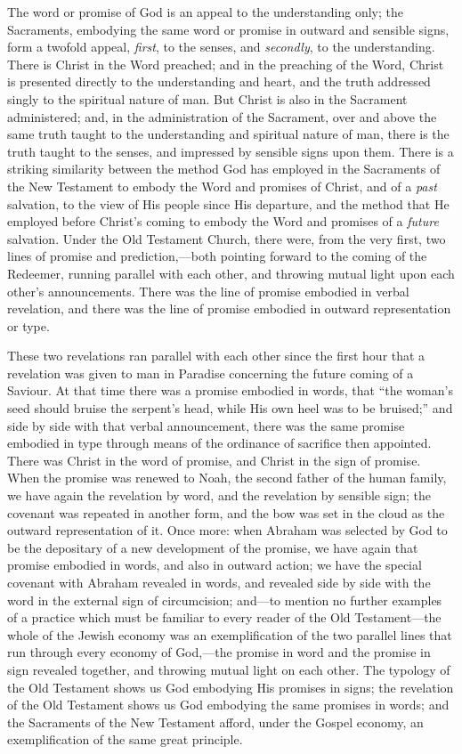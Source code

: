 \documentclass[
  english,
]{book}
\begin{document}
The word or promise of God is an appeal to the understanding only; the Sacraments, embodying the same word or promise in outward and sensible signs, form a twofold appeal, \emph{first}, to the senses, and \emph{secondly}, to the understanding. There is Christ in the Word preached; and in the preaching of the Word, Christ is presented directly to the understanding and heart, and the truth addressed singly to the spiritual nature of man. But Christ is also in the Sacrament administered; and, in the administration of the Sacrament, over and above the same truth taught to the understanding and spiritual nature of man, there is the truth taught to the senses, and impressed by sensible signs upon them. There is a striking similarity between the method God has employed in the Sacraments of the New Testament to embody the Word and promises of Christ, and of a \emph{past} salvation, to the view of His people since His departure, and the method that He employed before Christ's coming to embody the Word and promises of a \emph{future} salvation. Under the Old Testament Church, there were, from the very first, two lines of promise and prediction,---both pointing forward to the coming of the Redeemer, running parallel with each other, and throwing mutual light upon each other's announcements. There was the line of promise embodied in verbal revelation, and there was the line of promise embodied in outward representation or type.

These two revelations ran parallel with each other since the first hour that a revelation was given to man in Paradise concerning the future coming of a Saviour. At that time there was a promise embodied in words, that ``the woman's seed should bruise the serpent's head, while His own heel was to be bruised;'' and side by side with that verbal announcement, there was the same promise embodied in type through means of the ordinance of sacrifice then appointed. There was Christ in the word of promise, and Christ in the sign of promise. When the promise was renewed to Noah, the second father of the human family, we have again the revelation by word, and the revelation by sensible sign; the covenant was repeated in another form, and the bow was set in the cloud as the outward representation of it. Once more: when Abraham was selected by God to be the depositary of a new development of the promise, we have again that promise embodied in words, and also in outward action; we have the special covenant with Abraham revealed in words, and revealed side by side with the word in the external sign of circumcision; and---to mention no further examples of a practice which must be familiar to every reader of the Old Testament---the whole of the Jewish economy was an exemplification of the two parallel lines that run through every economy of God,---the promise in word and the promise in sign revealed together, and throwing mutual light on each other. The typology of the Old Testament shows us God embodying His promises in signs; the revelation of the Old Testament shows us God embodying the same promises in words; and the Sacraments of the New Testament afford, under the Gospel economy, an exemplification of the same great principle.
\end{document}
